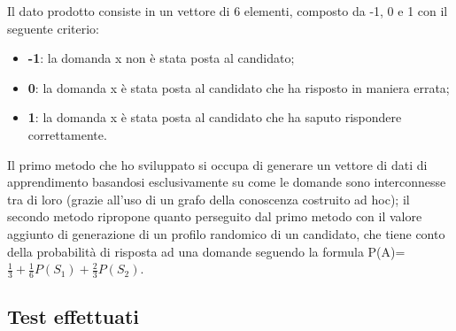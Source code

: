 Il dato prodotto consiste in un vettore di 6 elementi, composto da  -1, 0 e 1 con il seguente criterio:
\begin{itemize}
\item \textbf{-1}: la domanda x non \`e stata posta al candidato;
\item \textbf{0}: la domanda x \`e stata posta al candidato che ha risposto in maniera errata;
\item \textbf{1}: la domanda x \`e stata posta al candidato che ha saputo rispondere correttamente.
\end{itemize}
\noindent
Il primo metodo che ho sviluppato si occupa di generare un vettore di dati di apprendimento basandosi esclusivamente su come le domande sono interconnesse tra di loro (grazie all'uso di un grafo della conoscenza costruito ad hoc); il secondo metodo ripropone quanto perseguito dal primo metodo con il valore aggiunto di generazione di un profilo randomico di un candidato, che tiene conto della  probabilit\`a di risposta ad una domande seguendo la formula P(A)= $\frac{1}{3}+\frac{1}{6}P(S_1)+\frac{2}{3}P(S_2)$.

\subsection{Test effettuati}
\label{Test effettuati}

